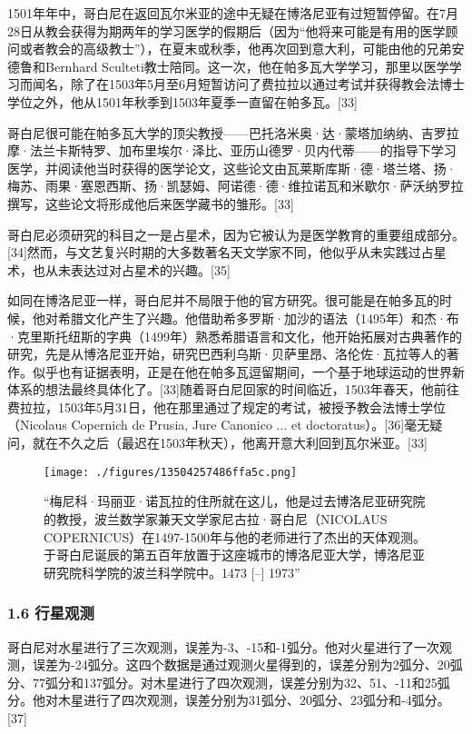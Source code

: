 1501年年中，哥白尼在返回瓦尔米亚的途中无疑在博洛尼亚有过短暂停留。在7月28日从教会获得为期两年的学习医学的假期后（因为“他将来可能是有用的医学顾问或者教会的高级教士”），在夏末或秋季，他再次回到意大利，可能由他的兄弟安德鲁和Bernhard Sculteti教士陪同。这一次，他在帕多瓦大学学习，那里以医学学习而闻名，除了在1503年5月至6月短暂访问了费拉拉以通过考试并获得教会法博士学位之外，他从1501年秋季到1503年夏季一直留在帕多瓦。[33]

哥白尼很可能在帕多瓦大学的顶尖教授——巴托洛米奥·达·蒙塔加纳纳、吉罗拉摩·法兰卡斯特罗、加布里埃尔·泽比、亚历山德罗·贝内代蒂——的指导下学习医学，并阅读他当时获得的医学论文，这些论文由瓦莱斯库斯·德·塔兰塔、扬·梅苏、雨果·塞恩西斯、扬·凯瑟姆、阿诺德·德·维拉诺瓦和米歇尔·萨沃纳罗拉撰写，这些论文将形成他后来医学藏书的雏形。[33]

哥白尼必须研究的科目之一是占星术，因为它被认为是医学教育的重要组成部分。[34]然而，与文艺复兴时期的大多数著名天文学家不同，他似乎从未实践过占星术，也从未表达过对占星术的兴趣。[35]

如同在博洛尼亚一样，哥白尼并不局限于他的官方研究。很可能是在帕多瓦的时候，他对希腊文化产生了兴趣。他借助希多罗斯·加沙的语法（1495年）和杰·布·克里斯托纽斯的字典（1499年）熟悉希腊语言和文化，他开始拓展对古典著作的研究，先是从博洛尼亚开始，研究巴西利乌斯·贝萨里昂、洛伦佐·瓦拉等人的著作。似乎也有证据表明，正是在他在帕多瓦逗留期间，一个基于地球运动的世界新体系的想法最终具体化了。[33]随着哥白尼回家的时间临近，1503年春天，他前往费拉拉，1503年5月31日，他在那里通过了规定的考试，被授予教会法博士学位（Nicolaus Copernich de Prusia, Jure Canonico ... et doctoratus）。[36]毫无疑问，就在不久之后（最迟在1503年秋天），他离开意大利回到瓦尔米亚。[33]
\begin{figure}[ht]
\centering
\texttt{[image: ./figures/13504257486ffa5c.png]}
\caption{“梅尼科·玛丽亚·诺瓦拉的住所就在这儿，他是过去博洛尼亚研究院的教授，波兰数学家兼天文学家尼古拉·哥白尼（NICOLAUS COPERNICUS）在1497-1500年与他的老师进行了杰出的天体观测。于哥白尼诞辰的第五百年放置于这座城市的博洛尼亚大学，博洛尼亚研究院科学院的波兰科学院中。1473 [–] 1973”} \label{fig_GBN_7}
\end{figure}

\subsubsection{1.6 行星观测}
哥白尼对水星进行了三次观测，误差为-3、-15和-1弧分。他对火星进行了一次观测，误差为-24弧分。这四个数据是通过观测火星得到的，误差分别为2弧分、20弧分、77弧分和137弧分。对木星进行了四次观测，误差分别为32、51、-11和25弧分。他对木星进行了四次观测，误差分别为31弧分、20弧分、23弧分和-4弧分。[37]

